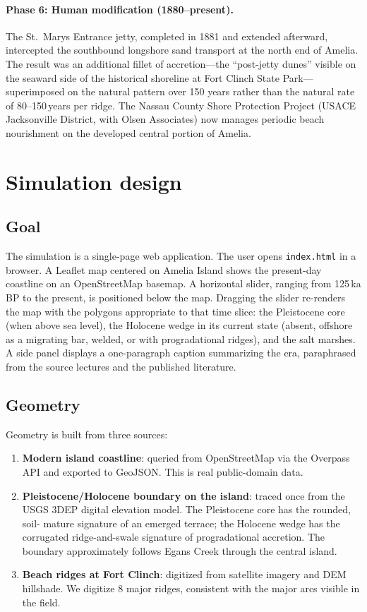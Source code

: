 \documentclass[11pt]{article}
\begin{document}
\paragraph{Phase 6: Human modification (1880--present).}
The St.\ Marys Entrance jetty, completed in 1881 and extended afterward,
intercepted the southbound longshore sand transport at the north end of Amelia.
The result was an additional fillet of accretion---the ``post-jetty dunes''
visible on the seaward side of the historical shoreline at Fort Clinch State
Park---superimposed on the natural pattern over 150 years rather than the
natural rate of 80--150\,years per ridge. The Nassau County Shore Protection
Project (USACE Jacksonville District, with Olsen Associates) now manages
periodic beach nourishment on the developed central portion of Amelia.

\section{Simulation design}

\subsection{Goal}
The simulation is a single-page web application. The user opens \texttt{index.html}
in a browser. A Leaflet \cite{leaflet} map centered on Amelia Island shows the
present-day coastline on an OpenStreetMap basemap. A horizontal slider, ranging
from 125\,ka BP to the present, is positioned below the map. Dragging the slider
re-renders the map with the polygons appropriate to that time slice: the
Pleistocene core (when above sea level), the Holocene wedge in its current state
(absent, offshore as a migrating bar, welded, or with progradational ridges), and
the salt marshes. A side panel displays a one-paragraph caption summarizing the
era, paraphrased from the source lectures and the published literature.

\subsection{Geometry}
Geometry is built from three sources:

\begin{enumerate}[leftmargin=2em]
\item \textbf{Modern island coastline}: queried from OpenStreetMap via the Overpass
API and exported to GeoJSON. This is real public-domain data.
\item \textbf{Pleistocene/Holocene boundary on the island}: traced once from the
USGS 3DEP digital elevation model. The Pleistocene core has the rounded, soil-
mature signature of an emerged terrace; the Holocene wedge has the corrugated
ridge-and-swale signature of progradational accretion. The boundary
approximately follows Egans Creek through the central island.
\item \textbf{Beach ridges at Fort Clinch}: digitized from satellite imagery and
DEM hillshade. We digitize 8 major ridges, consistent with the major arcs visible
in the field.
\end{enumerate}
\end{document}

